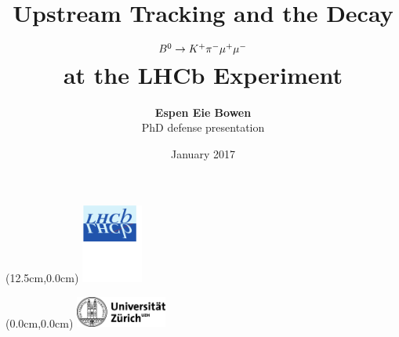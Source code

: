 \documentclass[aspectratio=1610]{beamer}
\begin{document}
\title[]{Upstream Tracking and the Decay ${B}^{0} \rightarrow K^{+}\pi^{-}\mu^{+}\mu^{-}$\\ at the LHCb Experiment}
\author[Espen Eie Bowen]{{\bf Espen Eie Bowen} \\ {\small PhD defense presentation}} 
\institute[]{}
\date{ January 2017}
\begin{frame}[plain]
\titlepage
\begin{textblock*}{2cm}(12.5cm,0.0cm)
  \includegraphics[width=2cm]{figs/lhcb-logo.pdf}
\end{textblock*}
\begin{textblock*}{5cm}(0.0cm,0.0cm)
  \includegraphics[width=3.0cm]{figs/uzh.jpg}
\end{textblock*}
\end{frame}
\end{document}
